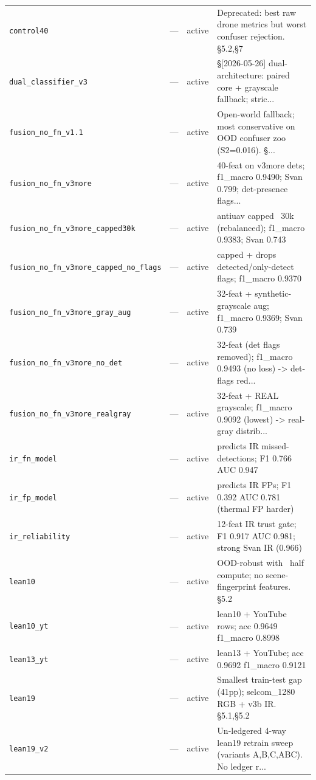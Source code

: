 \begin{longtable}{p{}llp{}}
\texttt{control40} & --- & active & Deprecated: best raw drone metrics but worst confuser rejection. §5.2,§7 \\
\texttt{dual\_classifier\_v3} & --- & active & §[2026-05-26] dual-architecture: paired core + grayscale fallback; stric... \\
\texttt{fusion\_no\_fn\_v1.1} & --- & active & Open-world fallback; most conservative on OOD confuser zoo (S2=0.016). §... \\
\texttt{fusion\_no\_fn\_v3more} & --- & active & 40-feat on v3more dets; f1\_macro 0.9490; Svan 0.799; det-presence flags... \\
\texttt{fusion\_no\_fn\_v3more\_capped30k} & --- & active & antiuav capped ~30k (rebalanced); f1\_macro 0.9383; Svan 0.743 \\
\texttt{fusion\_no\_fn\_v3more\_capped\_no\_flags} & --- & active & capped + drops detected/only-detect flags; f1\_macro 0.9370 \\
\texttt{fusion\_no\_fn\_v3more\_gray\_aug} & --- & active & 32-feat + synthetic-grayscale aug; f1\_macro 0.9369; Svan 0.739 \\
\texttt{fusion\_no\_fn\_v3more\_no\_det} & --- & active & 32-feat (det flags removed); f1\_macro 0.9493 (no loss) -> det-flags red... \\
\texttt{fusion\_no\_fn\_v3more\_realgray} & --- & active & 32-feat + REAL grayscale; f1\_macro 0.9092 (lowest) -> real-gray distrib... \\
\texttt{ir\_fn\_model} & --- & active & predicts IR missed-detections; F1 0.766 AUC 0.947 \\
\texttt{ir\_fp\_model} & --- & active & predicts IR FPs; F1 0.392 AUC 0.781 (thermal FP harder) \\
\texttt{ir\_reliability} & --- & active & 12-feat IR trust gate; F1 0.917 AUC 0.981; strong Svan IR (0.966) \\
\texttt{lean10} & --- & active & OOD-robust with ~half compute; no scene-fingerprint features. §5.2 \\
\texttt{lean10\_yt} & --- & active & lean10 + YouTube rows; acc 0.9649 f1\_macro 0.8998 \\
\texttt{lean13\_yt} & --- & active & lean13 + YouTube; acc 0.9692 f1\_macro 0.9121 \\
\texttt{lean19} & --- & active & Smallest train-test gap (41pp); selcom\_1280 RGB + v3b IR. §5.1,§5.2 \\
\texttt{lean19\_v2} & --- & active & Un-ledgered 4-way lean19 retrain sweep (variants A,B,C,ABC). No ledger r... \\

\end{longtable}

